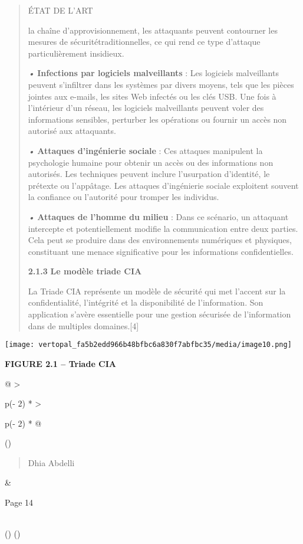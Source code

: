 \documentclass[
]{article}
\begin{document}
\begin{quote}
ÉTAT DE L'ART

la chaîne d'approvisionnement, les attaquants peuvent contourner les
mesures de sécuritétraditionnelles, ce qui rend ce type d'attaque
particulièrement insidieux.

\emph{•} \textbf{Infections par logiciels malveillants} : Les logiciels
malveillants peuvent s'infiltrer dans les systèmes par divers moyens,
tels que les pièces jointes aux e-mails, les sites Web infectés ou les
clés USB. Une fois à l'intérieur d'un réseau, les logiciels malveillants
peuvent voler des informations sensibles, perturber les opérations ou
fournir un accès non autorisé aux attaquants.

\emph{•} \textbf{Attaques d'ingénierie sociale} : Ces attaques
manipulent la psychologie humaine pour obtenir un accès ou des
informations non autorisés. Les techniques peuvent inclure l'usurpation
d'identité, le prétexte ou l'appâtage. Les attaques d'ingénierie sociale
exploitent souvent la confiance ou l'autorité pour tromper les
individus.

\emph{•} \textbf{Attaques de l'homme du milieu} : Dans ce scénario, un
attaquant intercepte et potentiellement modifie la communication entre
deux parties. Cela peut se produire dans des environnements numériques
et physiques, constituant une menace significative pour les informations
confidentielles.

\textbf{2.1.3} \textbf{Le modèle triade CIA}

La Triade CIA représente un modèle de sécurité qui met l'accent sur la
confidentialité, l'intégrité et la disponibilité de l'information. Son
application s'avère essentielle pour une gestion sécurisée de
l'information dans de multiples domaines.{[}4{]}
\end{quote}

\texttt{[image: vertopal\_fa5b2edd966b48bfbc6a830f7abfbc35/media/image10.png]}

\textbf{FIGURE 2.1 -- Triade CIA}

\begin{longtable}[]{@{}
  >{\raggedright\arraybackslash}p{(\columnwidth - 2\tabcolsep) * }
  >{\raggedright\arraybackslash}p{(\columnwidth - 2\tabcolsep) * }@{}}
\toprule()
\begin{minipage}[b]{\linewidth}\raggedright
\begin{quote}
Dhia Abdelli
\end{quote}
\end{minipage} & \begin{minipage}[b]{\linewidth}\raggedright
Page 14
\end{minipage} \\
\midrule()
\endhead
\bottomrule()
\end{longtable}
\end{document}
